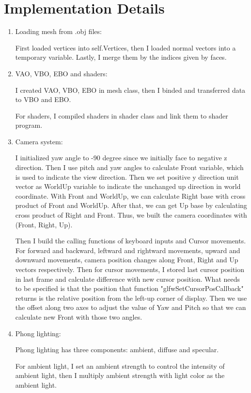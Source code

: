 \documentclass[acmtog]{acmart}
\begin{document}
\section{Implementation Details}
\begin{enumerate}	
	\setlength{\parindent}{2em}
	\item Loading mesh from .obj files:
	\par First loaded vertices into self.Vertices, then I loaded normal vectors into a temporary variable. Lastly, I merge them by the indices given by faces.
	\item VAO, VBO, EBO and shaders:
	\par I created VAO, VBO, EBO in mesh class, then I binded and transferred data to VBO and EBO.\par
	For shaders, I compiled shaders in shader class and link them to shader program.
	\item Camera system:\par
	I initialized yaw angle to -90 degree since we initially face to negative z direction. Then I use pitch and yaw angles to calculate Front variable, which is used to indicate the view direction. Then we set positive y direction unit vector as WorldUp variable to indicate the unchanged up direction in world coordinate. With Front and WorldUp, we can calculate Right base with cross product of Front and WorldUp. After that, we can get Up base by calculating cross product of Right and Front. Thus, we built the camera coordinates with (Front, Right, Up).\par
	Then I build the calling functions of keyboard inputs and Cursor movements. For forward and backward, leftward and rightward movements, upward and downward movements, camera position changes along Front, Right and Up vectors respectively. Then for cursor movements, I stored last cursor position in last frame and calculate difference with new cursor position. What needs to be specified is that the position that function "glfwSetCursorPosCallback" returns is the relative position from the left-up corner of display. Then we use the offset along two axes to adjust the value of Yaw and Pitch so that we can calculate new Front with those two angles.
	\item Phong lighting:\par
	Phong lighting has three components: ambient, diffuse and specular.\par For ambient light, I set an ambient strength to control the intensity of ambient light, then I multiply ambient strength with light color as the ambient light.\par

\end{enumerate}
\end{document}
